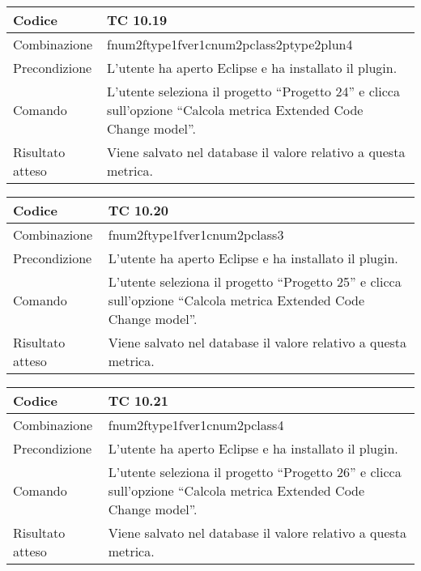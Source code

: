 \begin{table}[ht]
\begin{tabular}{|p{3cm}|p{9cm}|}
\hline
\cellcolor{lightgray}Codice				& TC 10.19								\\
\hline
\cellcolor{lightgray}Combinazione		& fnum2ftype1fver1cnum2pclass2ptype2plun4									\\
\hline
\cellcolor{lightgray}Precondizione		& L'utente ha aperto Eclipse e ha installato il plugin.		\\
\hline
\cellcolor{lightgray}Comando			& L'utente seleziona il progetto ``Progetto 24''  e clicca sull'opzione ``Calcola metrica Extended Code Change model''.	\\
\hline
\cellcolor{lightgray}Risultato atteso	& Viene salvato nel database il valore relativo a questa metrica.\\
\hline
\end{tabular}
\end{table}

\begin{table}[ht]
\begin{tabular}{|p{3cm}|p{9cm}|}
\hline
\cellcolor{lightgray}Codice				& TC 10.20								\\
\hline
\cellcolor{lightgray}Combinazione		& fnum2ftype1fver1cnum2pclass3									\\
\hline
\cellcolor{lightgray}Precondizione		& L'utente ha aperto Eclipse e ha installato il plugin.		\\
\hline
\cellcolor{lightgray}Comando			& L'utente seleziona il progetto ``Progetto 25''  e clicca sull'opzione ``Calcola metrica Extended Code Change model''.	\\
\hline
\cellcolor{lightgray}Risultato atteso	& Viene salvato nel database il valore relativo a questa metrica.\\
\hline
\end{tabular}
\end{table}

\begin{table}[ht]
\begin{tabular}{|p{3cm}|p{9cm}|}
\hline
\cellcolor{lightgray}Codice				& TC 10.21								\\
\hline
\cellcolor{lightgray}Combinazione		& fnum2ftype1fver1cnum2pclass4									\\
\hline
\cellcolor{lightgray}Precondizione		& L'utente ha aperto Eclipse e ha installato il plugin.		\\
\hline
\cellcolor{lightgray}Comando			& L'utente seleziona il progetto ``Progetto 26''  e clicca sull'opzione ``Calcola metrica Extended Code Change model''.	\\
\hline
\cellcolor{lightgray}Risultato atteso	& Viene salvato nel database il valore relativo a questa metrica.\\
\hline
\end{tabular}
\end{table}

